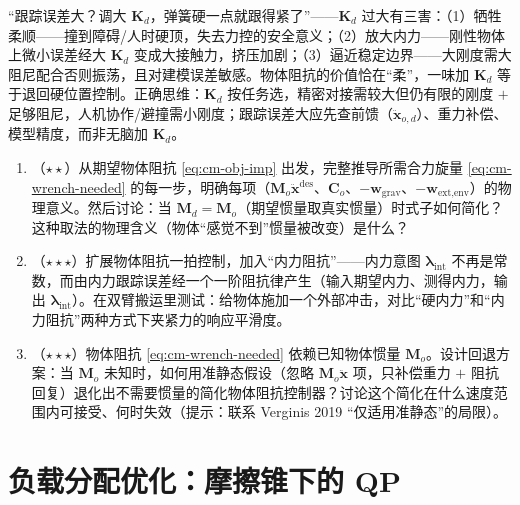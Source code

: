 \begin{pitfall}
“跟踪误差大？调大 $\mathbf{K}_d$，弹簧硬一点就跟得紧了”——$\mathbf{K}_d$ 过大有三害：（1）牺牲柔顺——撞到障碍/人时硬顶，失去力控的安全意义；（2）放大内力——刚性物体上微小误差经大 $\mathbf{K}_d$ 变成大接触力，挤压加剧；（3）逼近稳定边界——大刚度需大阻尼配合否则振荡，且对建模误差敏感。物体阻抗的价值恰在“柔”，一味加 $\mathbf{K}_d$ 等于退回硬位置控制。正确思维：$\mathbf{K}_d$ 按任务选，精密对接需较大但仍有限的刚度 $+$ 足够阻尼，人机协作/避撞需小刚度；跟踪误差大应先查前馈（$\ddot{\mathbf{x}}_{o,d}$）、重力补偿、模型精度，而非无脑加 $\mathbf{K}_d$。
\end{pitfall}

\begin{practice}
\begin{enumerate}
  \item （$\star\star$）从期望物体阻抗 \cref{eq:cm-obj-imp} 出发，完整推导所需合力旋量 \cref{eq:cm-wrench-needed} 的每一步，明确每项（$\mathbf{M}_o\ddot{\mathbf{x}}^{\text{des}}$、$\mathbf{C}_o$、$-\mathbf{w}_{\text{grav}}$、$-\mathbf{w}_{\text{ext,env}}$）的物理意义。然后讨论：当 $\mathbf{M}_d=\mathbf{M}_o$（期望惯量取真实惯量）时式子如何简化？这种取法的物理含义（物体“感觉不到”惯量被改变）是什么？
  \item （$\star\star\star$）扩展物体阻抗一拍控制，加入“内力阻抗”——内力意图 $\boldsymbol{\lambda}_{\text{int}}$ 不再是常数，而由内力跟踪误差经一个一阶阻抗律产生（输入期望内力、测得内力，输出 $\boldsymbol{\lambda}_{\text{int}}$）。在双臂搬运里测试：给物体施加一个外部冲击，对比“硬内力”和“内力阻抗”两种方式下夹紧力的响应平滑度。
  \item （$\star\star\star$）物体阻抗 \cref{eq:cm-wrench-needed} 依赖已知物体惯量 $\mathbf{M}_o$。设计回退方案：当 $\mathbf{M}_o$ 未知时，如何用准静态假设（忽略 $\mathbf{M}_o\ddot{\mathbf{x}}$ 项，只补偿重力 $+$ 阻抗回复）退化出不需要惯量的简化物体阻抗控制器？讨论这个简化在什么速度范围内可接受、何时失效（提示：联系 Verginis 2019 “仅适用准静态”的局限）。
\end{enumerate}
\end{practice}

\section{负载分配优化：摩擦锥下的 QP}
\label{sec:cm-qp}

